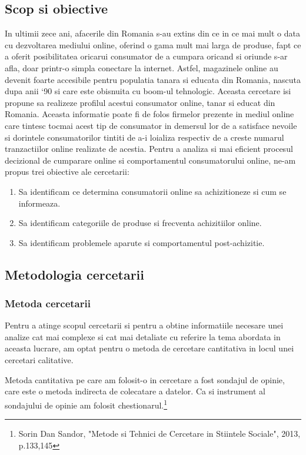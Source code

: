 \documentclass[a4paper, 12pt]{article}
\begin{document}
	\subsection{Scop si obiective}
	\qquad In ultimii zece ani, afacerile din Romania s-au extins din ce in ce mai mult o data cu dezvoltarea mediului online, oferind o gama mult mai larga de produse, fapt ce a oferit posibilitatea oricarui consumator de a cumpara oricand si oriunde s-ar afla, doar printr-o simpla conectare la internet. Astfel, magazinele online au devenit foarte accesibile pentru populatia tanara si educata din Romania, nascuta dupa anii `90 si care este obisnuita cu boom-ul tehnologic. Aceasta cercetare isi propune sa realizeze profilul  acestui consumator online, tanar si educat din Romania.  Aceasta informatie poate fi de folos  firmelor prezente in mediul online care tintesc tocmai acest tip de consumator in demersul lor de a satisface nevoile si dorintele consumatorilor tintiti de a-i loializa respectiv de a creste numarul tranzactiilor online realizate de acestia. Pentru a analiza si mai eficient procesul decizional de cumparare online si comportamentul consumatorului online, ne-am propus trei obiective ale cercetarii: 
	\begin{enumerate}[(1)]
		\item Sa identificam ce determina consumatorii online sa achizitioneze si cum se informeaza.
		\item Sa identificam categoriile de produse si frecventa achizitiilor online.
		\item Sa identificam problemele aparute si comportamentul post-achizitie.
	\end{enumerate}
	\subsection{Metodologia cercetarii}
	\subsubsection{Metoda cercetarii}
	\qquad Pentru a atinge scopul cercetarii si pentru a obtine informatiile necesare unei analize cat mai complexe si cat mai detaliate cu referire la tema abordata in aceasta lucrare, am optat pentru o metoda de cercetare cantitativa in locul unei cercetari calitative.
	
	\quad Metoda cantitativa pe care am folosit-o in cercetare a fost sondajul de opinie, care este o metoda indirecta de colecatare a datelor. Ca si instrument al sondajului de opinie am folosit chestionarul.\footnote{Sorin Dan Sandor, "Metode si Tehnici de Cercetare in Stiintele Sociale", 2013, p.133,145}
\end{document}
